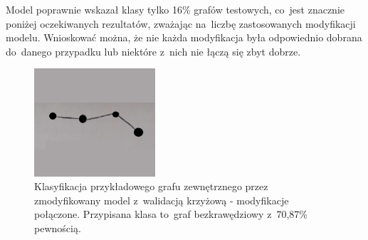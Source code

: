 Model poprawnie wskazał klasy tylko 16\% grafów testowych, co~jest znacznie poniżej oczekiwanych rezultatów,
zważając na~liczbę zastosowanych modyfikacji modelu.
Wnioskować można, że nie każda modyfikacja była odpowiednio dobrana do~danego przypadku
lub niektóre z~nich nie łączą się zbyt dobrze.

\begin{figure}[ht]
	\centering
	\includegraphics[height=4cm]{../graph_classification/test_graphs/drawn/path-3.png}
	\caption{Klasyfikacja przykładowego grafu zewnętrznego przez zmodyfikowany model z~walidacją krzyżową - modyfikacje połączone.
		Przypisana klasa to~graf bezkrawędziowy z~70,87\% pewnością.}
	\label{Fig:tests-cv-5d}
\end{figure}
\FloatBarrier